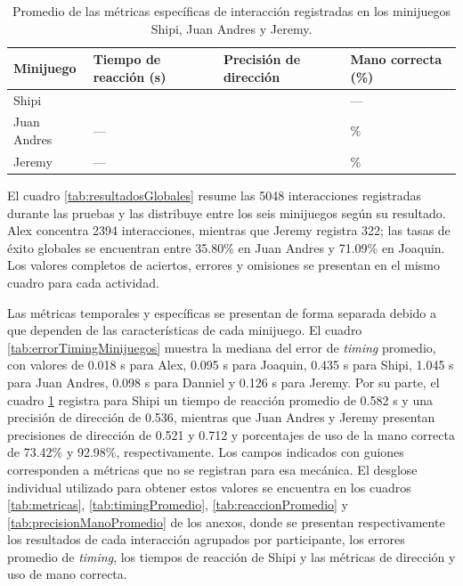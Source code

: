 \begin{table}[H]
    \centering
    \caption{Promedio de las métricas específicas de interacción registradas en los minijuegos Shipi, Juan Andres y Jeremy.}
    \label{tab:metricasEspecificas}

    \small
    \renewcommand{\arraystretch}{1.3}
    \setlength{\tabcolsep}{4pt}

    \begin{tabularx}{\textwidth}{
        |>{\centering\arraybackslash}X
        |>{\centering\arraybackslash}X
        |>{\centering\arraybackslash}X
        |>{\centering\arraybackslash}X|
    }
        \hline

        \textbf{Minijuego} &
        \textbf{Tiempo de reacción (s)} &
        \textbf{Precisión de dirección} &
        \textbf{Mano correcta (\%)} \\ \hline

        Shipi & 0.582 & 0.536 & --- \\ \hline
        Juan Andres & --- & 0.521 & 73.42\% \\ \hline
        Jeremy & --- & 0.712 & 92.98\% \\ \hline

    \end{tabularx}
\end{table}

El cuadro \ref{tab:resultadosGlobales} resume las 5048 interacciones 
registradas durante las pruebas y las distribuye entre los seis 
minijuegos según su resultado. Alex concentra 2394 interacciones, 
mientras que Jeremy registra 322; las tasas de éxito globales se 
encuentran entre 35.80\% en Juan Andres y 71.09\% en Joaquin. 
Los valores completos de aciertos, errores y omisiones se presentan en el 
mismo cuadro para cada actividad. 

Las métricas temporales y específicas se presentan de forma separada 
debido a que dependen de las características de cada minijuego. El 
cuadro \ref{tab:errorTimingMinijuegos} muestra la mediana del error de 
\textit{timing} promedio, con valores de 0.018 s para Alex, 0.095 s para 
Joaquin, 0.435 s para Shipi, 1.045 s para Juan Andres, 0.098 s para 
Danniel y 0.126 s para Jeremy. Por su parte, el cuadro 
\ref{tab:metricasEspecificas} registra para Shipi un tiempo de reacción 
promedio de 0.582 s y una precisión de dirección de 0.536, mientras que 
Juan Andres y Jeremy presentan precisiones de dirección de 0.521 y 0.712 
y porcentajes de uso de la mano correcta de 73.42\% y 92.98\%, 
respectivamente. Los campos indicados con guiones corresponden a 
métricas que no se registran para esa mecánica. El desglose individual 
utilizado para obtener estos valores se encuentra en los cuadros 
\ref{tab:metricas}, \ref{tab:timingPromedio}, \ref{tab:reaccionPromedio} 
y \ref{tab:precisionManoPromedio} de los anexos, donde se presentan 
respectivamente los resultados de cada interacción agrupados por 
participante, los errores promedio de \textit{timing}, los tiempos de 
reacción de Shipi y las métricas de dirección y uso de mano correcta.

